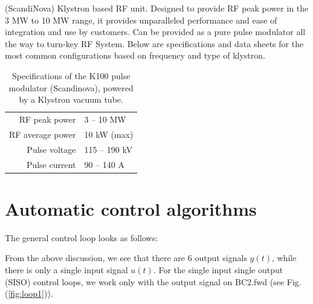 \documentclass[12pt]{amsart}
\begin{document}
(ScandiNova) Klystron based RF unit. 
Designed to provide RF peak power in the 3 MW to 10 MW range, it provides unparalleled performance and ease of integration and use by customers. 
Can be provided as a pure pulse modulator all the way to turn-key RF System. Below are specifications and data sheets for the most common configurations based on frequency and type of klystron.


\begin{table}
	\begin{center}
	\begin{tabular}{r|l}\hline\hline
	RF peak power		& 3 – 10 MW \\
	RF average power 	& 10 kW (max)\\
	Pulse voltage		& 115 – 190 kV\\
	Pulse current		& 90 – 140 A\\
	\hline
   \end{tabular}
   \caption{Specifications of the K100 pulse modulator (Scandinova), powered by a Klystron vacuum tube.}
  \end{center}
\end{table}


\newpage
{}
\section{Automatic control algorithms}


The general control loop looks as follows:

\begin{center}
\end{center}
From the above discussion, we see that there are 6 output signals $y(t)$, while there is only a single input signal $u(t)$.
For the single input single output (SISO) control loops, we work only with the output signal on BC2.fwd (see Fig. (\ref{fig:loop1})).
\end{document}
